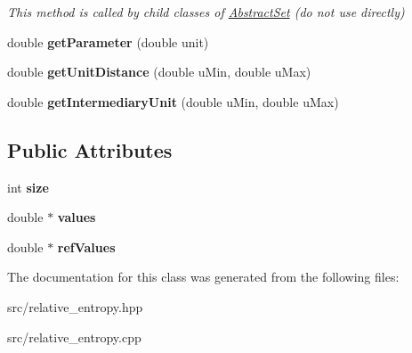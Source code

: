\begin{DoxyCompactItemize}
\begin{DoxyCompactList}\small\item\em This method is called by child classes of \hyperlink{classAbstractSet}{Abstract\-Set} (do not use directly) \end{DoxyCompactList}\item 
\hypertarget{classRelativeEntropy_ac021b7887e7ccb9d23a865ab3cdb0704}{double {\bfseries get\-Parameter} (double unit)}\label{classRelativeEntropy_ac021b7887e7ccb9d23a865ab3cdb0704}

\item 
\hypertarget{classRelativeEntropy_ab2173fffca585fc30bfe66ae2b3fd06a}{double {\bfseries get\-Unit\-Distance} (double u\-Min, double u\-Max)}\label{classRelativeEntropy_ab2173fffca585fc30bfe66ae2b3fd06a}

\item 
\hypertarget{classRelativeEntropy_a92c8e2ced62582fcd1dec801cedee04f}{double {\bfseries get\-Intermediary\-Unit} (double u\-Min, double u\-Max)}\label{classRelativeEntropy_a92c8e2ced62582fcd1dec801cedee04f}

\end{DoxyCompactItemize}
\subsection*{Public Attributes}
\begin{DoxyCompactItemize}
\item 
\hypertarget{classRelativeEntropy_a684e97eedbf983c173161693dbf89836}{int {\bfseries size}}\label{classRelativeEntropy_a684e97eedbf983c173161693dbf89836}

\item 
\hypertarget{classRelativeEntropy_abf8732d75d92b5e43deafba0b7a4d262}{double $\ast$ {\bfseries values}}\label{classRelativeEntropy_abf8732d75d92b5e43deafba0b7a4d262}

\item 
\hypertarget{classRelativeEntropy_a31d0f68b5478c06f9935e523c34e0df1}{double $\ast$ {\bfseries ref\-Values}}\label{classRelativeEntropy_a31d0f68b5478c06f9935e523c34e0df1}

\end{DoxyCompactItemize}


The documentation for this class was generated from the following files\-:\begin{DoxyCompactItemize}
\item 
src/relative\-\_\-entropy.\-hpp\item 
src/relative\-\_\-entropy.\-cpp\end{DoxyCompactItemize}
